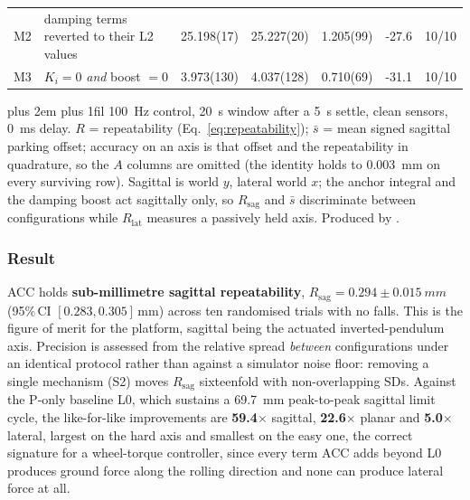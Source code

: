 \documentclass{jcd}
\newcommand{\tabnote}{\par\leftskip=0pt\rightskip=0pt plus 2em%
  \parfillskip=0pt plus 1fil\relax}
\begin{document}
\begin{table}[tp]
\begin{tabular}{@{}ll S[table-format=2.3(4)] S[table-format=2.3(3)] S[table-format=2.3(4)] S[table-format=-2.1] c@{}}
M2 & damping terms reverted to their L2 values & 25.198(17) & 25.227(20) & 1.205(99) & -27.6 & 10/10 \\
M3 & $K_i{=}0$ \emph{and} boost $=0$ & 3.973(130) & 4.037(128) & 0.710(69) & -31.1 & 10/10 \\
\bottomrule
\end{tabular}
\vspace{2pt}\tabnote\noindent
\SI{100}{Hz} control, \SI{20}{s} window after a \SI{5}{s} settle, clean sensors,
\SI{0}{ms} delay. $R$ = repeatability (Eq.~\eqref{eq:repeatability}); $\bar{s}$
= mean signed sagittal parking offset; accuracy on an axis is that offset and
the repeatability in quadrature, so the $A$ columns are omitted (the identity
holds to \SI{0.003}{mm} on every surviving row). Sagittal is world $y$, lateral
world $x$; the anchor integral and the damping boost act sagittally only, so
$R_{\text{sag}}$ and $\bar{s}$ discriminate between configurations while
$R_{\text{lat}}$ measures a passively held axis. Produced by
.
\end{table}

\subsubsection{Result}

ACC holds \textbf{sub-millimetre sagittal repeatability},
$R_{\text{sag}}=0.294{\pm}\SI{0.015}{mm}$ (95\%\,CI $[0.283,0.305]$\,mm) across
ten randomised trials with no falls. This is the figure of merit for the platform,
sagittal being the actuated inverted-pendulum axis. Precision is assessed from
the relative spread \emph{between} configurations under an identical protocol
rather than against a simulator noise floor: removing a single mechanism (S2)
moves $R_{\text{sag}}$ sixteenfold with non-overlapping SDs. Against the P-only
baseline L0, which sustains a \SI{69.7}{mm} peak-to-peak sagittal limit cycle,
the like-for-like improvements are \textbf{59.4}$\times$ sagittal,
\textbf{22.6}$\times$ planar and \textbf{5.0}$\times$ lateral, largest on the hard axis and smallest on the easy one, the correct signature for a wheel-torque
controller, since every term ACC adds beyond L0 produces ground force along the
rolling direction and none can produce lateral force at all.
\end{document}
